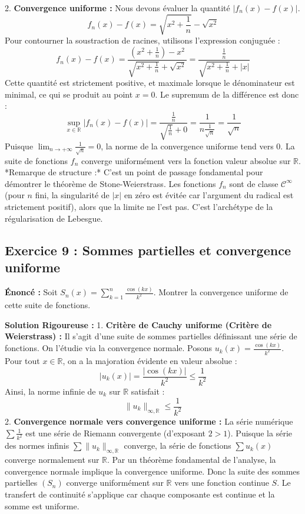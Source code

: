 \documentclass[11pt,a4paper]{article}
\begin{document}
2. \textbf{Convergence uniforme :}
Nous devons évaluer la quantité $|f_n(x) - f(x)|$.
$$f_n(x) - f(x) = \sqrt{x^2 + \frac{1}{n}} - \sqrt{x^2}$$
Pour contourner la soustraction de racines, utilisons l'expression conjuguée :
$$f_n(x) - f(x) = \frac{(x^2 + \frac{1}{n}) - x^2}{\sqrt{x^2 + \frac{1}{n}} + \sqrt{x^2}} = \frac{\frac{1}{n}}{\sqrt{x^2 + \frac{1}{n}} + |x|}$$
Cette quantité est strictement positive, et maximale lorsque le dénominateur est minimal, ce qui se produit au point $x = 0$.
Le supremum de la différence est donc :
$$\sup_{x \in \mathbb{R}} |f_n(x) - f(x)| = \frac{\frac{1}{n}}{\sqrt{\frac{1}{n}} + 0} = \frac{1}{n \frac{1}{\sqrt{n}}} = \frac{1}{\sqrt{n}}$$
Puisque $\lim_{n \to +\infty} \frac{1}{\sqrt{n}} = 0$, la norme de la convergence uniforme tend vers 0.
La suite de fonctions $f_n$ converge uniformément vers la fonction valeur absolue sur $\mathbb{R}$.
*Remarque de structure :* C'est un point de passage fondamental pour démontrer le théorème de Stone-Weierstrass. Les fonctions $f_n$ sont de classe $\mathcal{C}^\infty$ (pour $n$ fini, la singularité de $|x|$ en zéro est évitée car l'argument du radical est strictement positif), alors que la limite ne l'est pas. C'est l'archétype de la régularisation de Lebesgue.


\subsection*{Exercice 9 : Sommes partielles et convergence uniforme}
\textbf{Énoncé :}
Soit $S_n(x) = \sum_{k=1}^n \frac{\cos(kx)}{k^2}$. Montrer la convergence uniforme de cette suite de fonctions.

\textbf{Solution Rigoureuse :}
1. \textbf{Critère de Cauchy uniforme (Critère de Weierstrass) :}
Il s'agit d'une suite de sommes partielles définissant une série de fonctions. On l'étudie via la convergence normale.
Posons $u_k(x) = \frac{\cos(kx)}{k^2}$.
Pour tout $x \in \mathbb{R}$, on a la majoration évidente en valeur absolue :
$$|u_k(x)| = \frac{|\cos(kx)|}{k^2} \le \frac{1}{k^2}$$
Ainsi, la norme infinie de $u_k$ sur $\mathbb{R}$ satisfait :
$$\|u_k\|_{\infty, \mathbb{R}} \le \frac{1}{k^2}$$
2. \textbf{Convergence normale vers convergence uniforme :}
La série numérique $\sum \frac{1}{k^2}$ est une série de Riemann convergente (d'exposant $2 > 1$).
Puisque la série des normes infinis $\sum \|u_k\|_{\infty, \mathbb{R}}$ converge, la série de fonctions $\sum u_k(x)$ converge normalement sur $\mathbb{R}$.
Par un théorème fondamental de l'analyse, la convergence normale implique la convergence uniforme.
Donc la suite des sommes partielles $(S_n)$ converge uniformément sur $\mathbb{R}$ vers une fonction continue $S$.
Le transfert de continuité s'applique car chaque composante est continue et la somme est uniforme.
\end{document}
